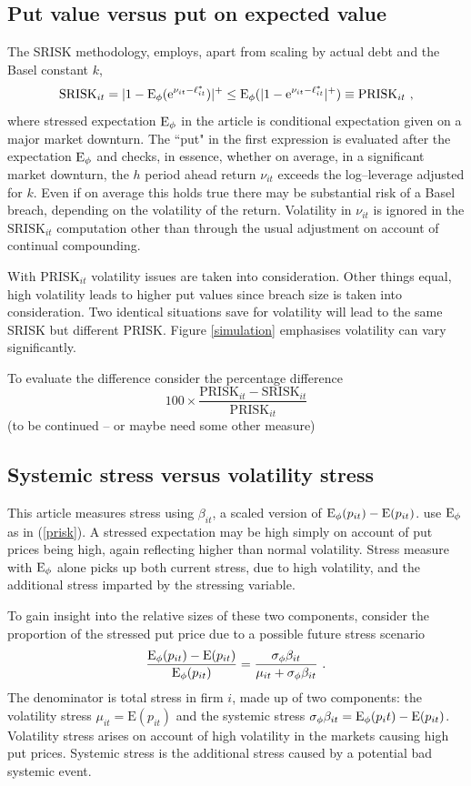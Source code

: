 \documentclass[authoryear]{elsarticle}
\newcommand{\E}{\mathrm{E}}
\newcommand{\e}{\mathrm{e}}
\newcommand{\eref}[1]{(\ref{#1})}
\newcommand{\fref}[1]{Figure \ref{#1}}
\newcommand{\be}[1]{\begin{equation}\label{#1}}
\newcommand{\ee}{\end{equation}}
\begin{document}
\subsection{Put value versus put on expected value} 

The SRISK methodology, employs, apart from scaling by actual debt and the Basel constant $k$,
\be{prisk}
\mathrm{SRISK}_{it} = |1-\E_\phi(\e^{\nu_{it}-\ell_{it}^*})|^+\le \Es(|1-\e^{\nu_{it}-\ell_{it}^*}|^+) \equiv \mathrm{PRISK}_{it}\ , 
\ee
where stressed expectation $\Es$ in the \cite{brownlees2015} article is conditional expectation given on a major market downturn.  The   ``put" in the first expression is evaluated after the expectation $\Es$ and checks, in essence, whether on average, in a significant market downturn, the $h$ period ahead return $\nu_{it}$ exceeds the   log--leverage adjusted for $k$.  Even if on average this holds true there may be substantial risk of a Basel breach, depending on the volatility of the return.   Volatility in $\nu_{it}$ is ignored in the $\mathrm{SRISK}_{it}$ computation other than through the usual adjustment on account of continual compounding.

With $\mathrm{PRISK}_{it}$ volatility issues are taken into consideration.  Other things equal, high volatility leads to higher put values since breach size  is taken into consideration.   Two identical situations save for volatility will lead to the same SRISK but different PRISK.  \fref{simulation} emphasises volatility  can vary significantly.

To evaluate the difference consider the percentage difference
$$
100\times \frac{\mathrm{PRISK}_{it}-\mathrm{SRISK}_{it}}{\mathrm{PRISK}_{it}}
$$
(to be continued -- or maybe need some other measure)

\subsection{Systemic stress versus volatility stress}

This article measures stress using $\beta_{it}$, a scaled version of $\Es(p_{it})-\E(p_{it})$.   \cite{brownlees2015} use $\Es$ as in \eref{prisk}.  A stressed expectation may be high simply on account of put prices being high, again reflecting higher than normal volatility.
Stress measure with $\Es$ alone picks up both current stress, due to high volatility, and the additional stress imparted by the stressing variable.

To gain insight into the relative sizes of these two components, consider the proportion of the stressed put price due to a possible future stress scenario
$$
\frac{\Es(p_{it})-\E(p_{it})}{\Es(p_{it})} = \frac{\sigma_\phi\beta_{it}}{\mu_{it}+\sigma_\phi\beta_{it}}  \ . 
$$
The denominator is total stress in firm $i$, made up of two components:   the volatility stress $\mu_{it}=\E(p_{it})$ and the systemic stress $\sigma_\phi\beta_{it}=\Es(p_it)-\E(p_{it})$.   Volatility stress  arises on account  of high volatility in the markets causing high put prices.   Systemic stress is the additional stress caused by  a potential  bad systemic event.     
\end{document}
